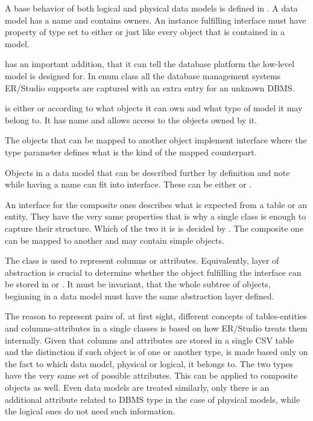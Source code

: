 A base behavior of both logical and physical data models is defined in .
A data model has a name and contains owners. An instance fulfilling  interface must have property of type  set to either  or  just like every object that is contained in a model.

 has an important addition, that it can tell the database platform the low-level model is designed for. In enum class  all the database management systems ER/Studio supports are captured with an extra entry for an unknown DBMS.

 is either  or  according to what objects it can own and what type of model it may belong to. 
It has name and allows access to the objects owned by it.

The objects that can be mapped to another object implement interface  where the type parameter defines what is the kind of the mapped counterpart.

Objects in a data model that can be described further by definition and note while having a name can fit into  interface. These can be either  or .

An interface for the composite ones describes what is expected from a table or an entity.
They have the very same properties that is why a single class is enough to capture their structure. Which of the two it is is decided by .
The composite one can be mapped to another  and may contain simple objects.

The  class is used to represent columns or attributes. Equivalently, layer of abstraction is crucial to determine whether the object fulfilling the interface can be stored in  or . It must be invariant, that the whole subtree of objects, beginning in a data model must have the same abstraction layer defined.

The reason to represent pairs of, at first sight, different concepts of tables-entities and columns-attributes in a single classes is based on how ER/Studio treats them internally. Given that columns and attributes are stored in a single CSV table and the distinction if such object is of one or another type, is made based only on the fact to which data model, physical or logical, it belongs to. The two types have the very same set of possible attributes. This can be applied to composite objects as well. Even data models are treated similarly, only there is an additional attribute related to DBMS type in the case of physical models, while the logical ones do not need such information.
 
